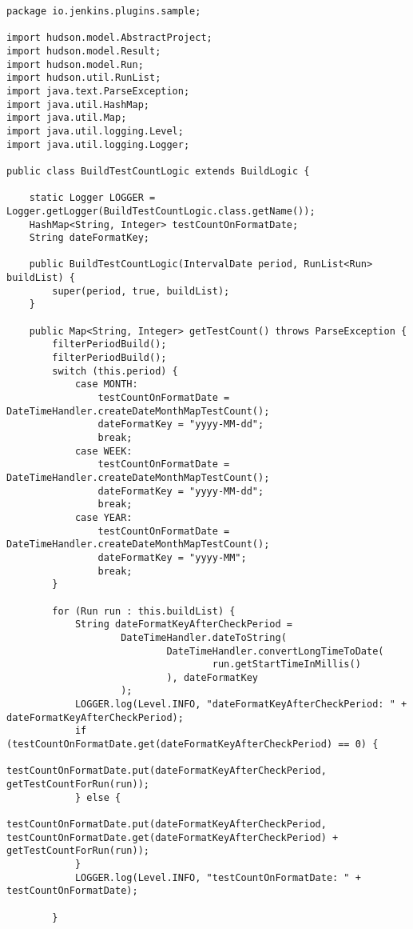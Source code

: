 \begin{lstlisting}
package io.jenkins.plugins.sample;

import hudson.model.AbstractProject;
import hudson.model.Result;
import hudson.model.Run;
import hudson.util.RunList;
import java.text.ParseException;
import java.util.HashMap;
import java.util.Map;
import java.util.logging.Level;
import java.util.logging.Logger;

public class BuildTestCountLogic extends BuildLogic {

    static Logger LOGGER = Logger.getLogger(BuildTestCountLogic.class.getName());
    HashMap<String, Integer> testCountOnFormatDate;
    String dateFormatKey;

    public BuildTestCountLogic(IntervalDate period, RunList<Run> buildList) {
        super(period, true, buildList);
    }

    public Map<String, Integer> getTestCount() throws ParseException {
        filterPeriodBuild();
        filterPeriodBuild();
        switch (this.period) {
            case MONTH:
                testCountOnFormatDate = DateTimeHandler.createDateMonthMapTestCount();
                dateFormatKey = "yyyy-MM-dd";
                break;
            case WEEK:
                testCountOnFormatDate = DateTimeHandler.createDateMonthMapTestCount();
                dateFormatKey = "yyyy-MM-dd";
                break;
            case YEAR:
                testCountOnFormatDate = DateTimeHandler.createDateMonthMapTestCount();
                dateFormatKey = "yyyy-MM";
                break;
        }

        for (Run run : this.buildList) {
            String dateFormatKeyAfterCheckPeriod =
                    DateTimeHandler.dateToString(
                            DateTimeHandler.convertLongTimeToDate(
                                    run.getStartTimeInMillis()
                            ), dateFormatKey
                    );
            LOGGER.log(Level.INFO, "dateFormatKeyAfterCheckPeriod: " + dateFormatKeyAfterCheckPeriod);
            if (testCountOnFormatDate.get(dateFormatKeyAfterCheckPeriod) == 0) {
                testCountOnFormatDate.put(dateFormatKeyAfterCheckPeriod, getTestCountForRun(run));
            } else {
                testCountOnFormatDate.put(dateFormatKeyAfterCheckPeriod, testCountOnFormatDate.get(dateFormatKeyAfterCheckPeriod) + getTestCountForRun(run));
            }
            LOGGER.log(Level.INFO, "testCountOnFormatDate: " + testCountOnFormatDate);

        }


\end{lstlisting}
